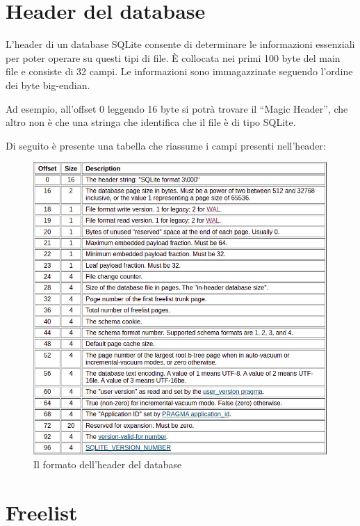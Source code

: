 \newpage

\section{Header del database}
L’header di un database SQLite consente di determinare le informazioni essenziali per poter operare su questi tipi di file. È collocata nei primi 100 byte del main file e consiste di 32 campi. Le informazioni sono immagazzinate seguendo l’ordine dei byte big-endian.

\medskip
Ad esempio, all’offset 0 leggendo 16 byte si potrà trovare il “Magic Header”, che altro non è che una stringa che identifica che il file è di tipo SQLite.

\medskip

Di seguito è presente una tabella che riassume i campi presenti nell’header:
\begin{figure}[ht]
	\centering
	\caption{Il formato dell'header del database}
	\label{fig:sqlitedatabaseheader}
	\includegraphics[scale=0.5]{assets/database_header_sqlite}
\end{figure}

\newpage

\section{Freelist}

